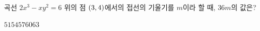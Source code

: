 곡선 $2x^3-xy^2=6$ 위의 점 $(3{,}\mkern3mu\mathopen{}4)$에서의 접선의 기울기를 $m$이라 할 때, $36m$의 값은?
\begin{choices32}{$51$}{$54$}{$57$}{$60$}{$63$}\end{choices32}
